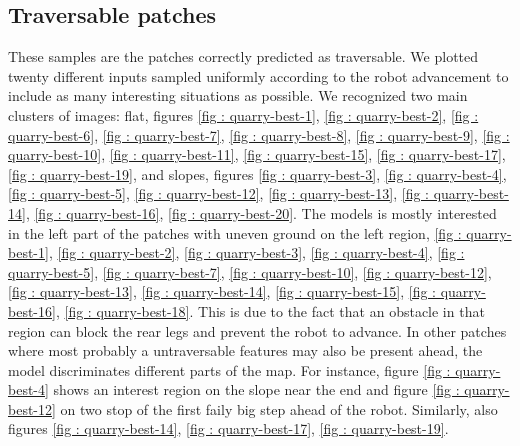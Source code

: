 \subsection{Traversable patches}
These samples are the patches correctly predicted as traversable. We plotted twenty different inputs sampled uniformly according to the robot advancement to include as many interesting situations as possible. We recognized two main clusters of images: flat, figures \ref{fig : quarry-best-1},  \ref{fig : quarry-best-2},  \ref{fig : quarry-best-6},  \ref{fig : quarry-best-7},  \ref{fig : quarry-best-8},  \ref{fig : quarry-best-9},  \ref{fig : quarry-best-10},  \ref{fig : quarry-best-11},  \ref{fig : quarry-best-15},  \ref{fig : quarry-best-17},  \ref{fig : quarry-best-19}, and slopes, figures  \ref{fig : quarry-best-3},  \ref{fig : quarry-best-4},  \ref{fig : quarry-best-5},  \ref{fig : quarry-best-12},  \ref{fig : quarry-best-13},  \ref{fig : quarry-best-14},  \ref{fig : quarry-best-16},  \ref{fig : quarry-best-20}. The models is mostly interested in the left part of the patches with uneven ground on the left region, \ref{fig : quarry-best-1}, \ref{fig : quarry-best-2}, \ref{fig : quarry-best-3}, \ref{fig : quarry-best-4}, \ref{fig : quarry-best-5}, \ref{fig : quarry-best-7}, \ref{fig : quarry-best-10}, \ref{fig : quarry-best-12}, \ref{fig : quarry-best-13}, \ref{fig : quarry-best-14}, \ref{fig : quarry-best-15}, \ref{fig : quarry-best-16}, \ref{fig : quarry-best-18}. This is due to the fact that an obstacle in that region can block the rear legs and prevent the robot to advance. In other patches where most probably a untraversable features may also be present ahead, the model discriminates different parts of the map. For instance, figure \ref{fig : quarry-best-4} shows an interest region on the slope near the end and figure  \ref{fig : quarry-best-12} on two stop of the first faily big step ahead of the robot. Similarly, also figures  \ref{fig : quarry-best-14},  \ref{fig : quarry-best-17},  \ref{fig : quarry-best-19}.

